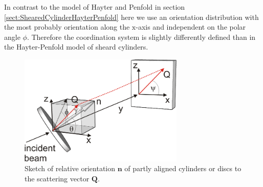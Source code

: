 In contrast to the model of Hayter and Penfold \cite{Hayter1984} in section \ref{sect:ShearedCylinderHayterPenfold} here we use an orientation distribution with the most probably orientation along the $\mathrm{x}$-axis and independent on the polar angle $\phi$.
Therefore the coordination system is slightly differently defined than in the Hayter-Penfold model of sheard cylinders. 
\begin{figure}[htb]
\begin{center}
\includegraphics[width=0.7\textwidth]{../images/form_factor/cylindrical_obj/partly_aligned_discs.png}
\end{center}
\caption{Sketch of relative orientation $\mathbf{n}$ of partly
aligned cylinders or discs to the scattering vector $\mathbf{Q}$.}
\label{fig:partly_aligned_discs}
\end{figure}

